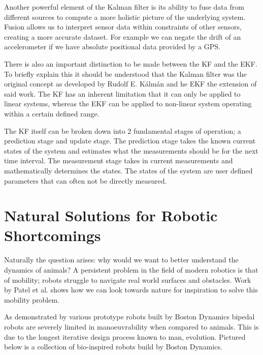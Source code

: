 Another powerful element of the Kalman filter is its ability to fuse data from different sources to compute a more holistic picture of the underlying system. Fusion allows us to interpret sensor data within constraints of other sensors, creating a more accurate dataset. For example we can negate the drift of an accelerometer if we have absolute positional data provided by a GPS. 

There is also an important distinction to be made between the KF and the EKF. To briefly explain this it should be understood that the Kalman filter was the original concept as developed by Rudolf E. Kálmán and he EKF the extension of said work. The KF has an inherent limitation that it can only be applied to linear systems, whereas the EKF can be applied to non-linear system operating within a certain defined range.

The KF itself can be broken down into 2 fundamental stages of operation; a prediction stage and update stage. The prediction stage takes the known current states of the system and estimates what the measurements should be for the next time interval. The measurement stage takes in current measurements and mathematically determines the states. The states of the system are user defined parameters that can often not be directly measured.


\section{Natural Solutions for Robotic Shortcomings}
Naturally the question arises:  why would we want to better understand the dynamics of animals? A persistent problem in the field of modern robotics is that of mobility; robots struggle to navigate real world surfaces and obstacles. Work by Patel et al. \cite{patel2013rapid} shows how we can look towards nature for inspiration to solve this mobility problem. 

As demonstrated by various prototype robots built by Boston Dynamics bipedal robots are severely limited in manoeuvrability when compared to animals. This is due to the longest iterative design process known to man, evolution. Pictured below is a collection of bio-inspired robots build by Boston Dynamics.

